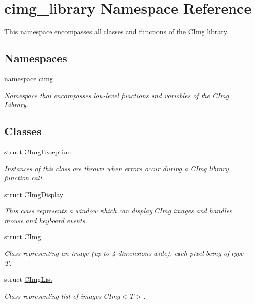 \hypertarget{namespacecimg__library}{
\section{cimg\_\-library Namespace Reference}
\label{namespacecimg__library}
}


This namespace encompasses all classes and functions of the CImg library.  


\subsection*{Namespaces}
\begin{DoxyCompactItemize}
\item 
namespace \hyperlink{namespacecimg__library_1_1cimg}{cimg}


\begin{DoxyCompactList}\small\item\em Namespace that encompasses {\itshape low-\/level\/} functions and variables of the CImg Library. \item\end{DoxyCompactList}

\end{DoxyCompactItemize}
\subsection*{Classes}
\begin{DoxyCompactItemize}
\item 
struct \hyperlink{structcimg__library_1_1CImgException}{CImgException}
\begin{DoxyCompactList}\small\item\em Instances of this class are thrown when errors occur during a CImg library function call. \item\end{DoxyCompactList}\item 
struct \hyperlink{structcimg__library_1_1CImgDisplay}{CImgDisplay}
\begin{DoxyCompactList}\small\item\em This class represents a window which can display \hyperlink{structcimg__library_1_1CImg}{CImg} images and handles mouse and keyboard events. \item\end{DoxyCompactList}\item 
struct \hyperlink{structcimg__library_1_1CImg}{CImg}
\begin{DoxyCompactList}\small\item\em Class representing an image (up to 4 dimensions wide), each pixel being of type {\ttfamily T}. \item\end{DoxyCompactList}\item 
struct \hyperlink{structcimg__library_1_1CImgList}{CImgList}
\begin{DoxyCompactList}\small\item\em Class representing list of images CImg$<$T$>$. \item\end{DoxyCompactList}\end{DoxyCompactItemize}


